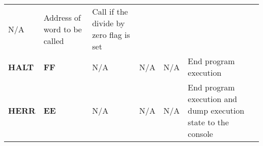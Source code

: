 \documentclass[]{article}
\begin{document}
\begin{longtable}[c]{@{}llllll@{}}
\begin{minipage}[t]{0.14\columnwidth}
N/A
\strut\end{minipage} &
\begin{minipage}[t]{0.14\columnwidth}\raggedright\strut
Address of word to be called
\strut\end{minipage} &
\begin{minipage}[t]{0.14\columnwidth}\raggedright\strut
Call if the divide by zero flag is set
\strut\end{minipage}\tabularnewline
\begin{minipage}[t]{0.14\columnwidth}\raggedright\strut
\textbf{HALT}
\strut\end{minipage} &
\begin{minipage}[t]{0.14\columnwidth}\raggedright\strut
\textbf{FF}
\strut\end{minipage} &
\begin{minipage}[t]{0.14\columnwidth}\raggedright\strut
N/A
\strut\end{minipage} &
\begin{minipage}[t]{0.14\columnwidth}\raggedright\strut
N/A
\strut\end{minipage} &
\begin{minipage}[t]{0.14\columnwidth}\raggedright\strut
N/A
\strut\end{minipage} &
\begin{minipage}[t]{0.14\columnwidth}\raggedright\strut
End program execution
\strut\end{minipage}\tabularnewline
\begin{minipage}[t]{0.14\columnwidth}\raggedright\strut
\textbf{HERR}
\strut\end{minipage} &
\begin{minipage}[t]{0.14\columnwidth}\raggedright\strut
\textbf{EE}
\strut\end{minipage} &
\begin{minipage}[t]{0.14\columnwidth}\raggedright\strut
N/A
\strut\end{minipage} &
\begin{minipage}[t]{0.14\columnwidth}\raggedright\strut
N/A
\strut\end{minipage} &
\begin{minipage}[t]{0.14\columnwidth}\raggedright\strut
N/A
\strut\end{minipage} &
\begin{minipage}[t]{0.14\columnwidth}\raggedright\strut
End program execution and dump execution state to the console
\strut\end{minipage}\tabularnewline
\bottomrule
\end{longtable}
\end{document}
